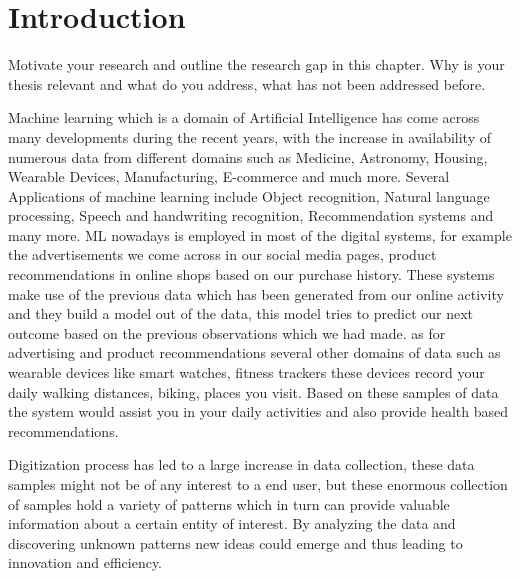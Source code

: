 \chapter{Introduction}\label{chap:introduction}


Motivate your research and outline the research gap in this chapter. Why is your thesis relevant and what do you address, what has not been addressed before. 


Machine learning which is a domain of Artificial Intelligence has come across many developments during the recent years, with the increase in availability of numerous data from different domains such as Medicine, Astronomy, Housing, Wearable Devices, Manufacturing, E-commerce and much more. Several Applications of machine learning include Object recognition, Natural language processing, Speech and handwriting recognition, Recommendation systems and many more. ML nowadays is employed in most of the digital systems, for example the advertisements we come across in our social media pages, product recommendations in online shops based on our purchase history. These systems make use of the previous data which has been generated from our online activity and they build a model out of the data, this model tries to predict our next outcome based on the previous observations which we had made. as for advertising and product recommendations several other domains of data such as wearable devices like smart watches, fitness trackers these devices record your daily walking distances, biking, places you visit. Based on these samples of data the system would assist you in your daily activities and also provide health based recommendations.

Digitization\cite{6147691} process has led to a large increase in data collection, these data samples might not be of any interest to a end user, but these enormous collection of samples hold a variety of patterns which in turn can provide valuable information about a certain entity of interest. By analyzing the data and discovering unknown patterns new ideas could emerge and thus leading to innovation and efficiency.

